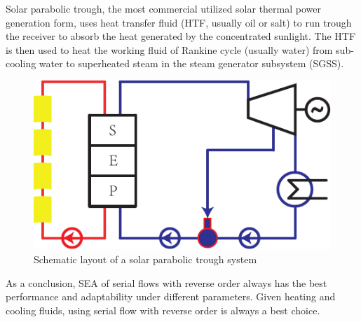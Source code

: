\documentclass{article}
\begin{document}
Solar parabolic trough, the most commercial utilized solar thermal power generation form, uses heat transfer fluid (HTF, usually oil or salt) to run trough the receiver to absorb the heat generated by the concentrated sunlight. The HTF is then used to heat the working fluid of Rankine cycle (usually water) from sub-cooling water to superheated steam in the steam generator subsystem (SGSS).


\begin{figure}[htbp]
\begin{center}
	\includegraphics[width = 0.7\columnwidth]{fig/SPTS}
	\caption{Schematic layout of a solar parabolic trough system}
	\label{fig:spts}
\end{center}
\end{figure}

As a conclusion, SEA of serial flows with reverse order always has the best performance and adaptability under different parameters. Given heating and cooling fluids, using serial flow with reverse order is always a best choice.



\clearpage
\printnomenclature[2.5cm]{}
\clearpage



\end{document}
